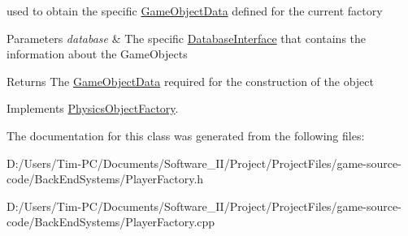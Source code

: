 used to obtain the specific \hyperlink{struct_game_object_data}{Game\+Object\+Data} defined for the current factory 


\begin{DoxyParams}{Parameters}
{\em database} & The specific \hyperlink{class_database_interface}{Database\+Interface} that contains the information about the Game\+Objects \\
\hline
\end{DoxyParams}
\begin{DoxyReturn}{Returns}
The \hyperlink{struct_game_object_data}{Game\+Object\+Data} required for the construction of the object 
\end{DoxyReturn}


Implements \hyperlink{class_physics_object_factory_aa59f52d3adc1fac676f4a8a3c2de9ba9}{Physics\+Object\+Factory}.



The documentation for this class was generated from the following files\+:\begin{DoxyCompactItemize}
\item 
D\+:/\+Users/\+Tim-\/\+P\+C/\+Documents/\+Software\+\_\+\+I\+I/\+Project/\+Project\+Files/game-\/source-\/code/\+Back\+End\+Systems/Player\+Factory.\+h\item 
D\+:/\+Users/\+Tim-\/\+P\+C/\+Documents/\+Software\+\_\+\+I\+I/\+Project/\+Project\+Files/game-\/source-\/code/\+Back\+End\+Systems/Player\+Factory.\+cpp\end{DoxyCompactItemize}
